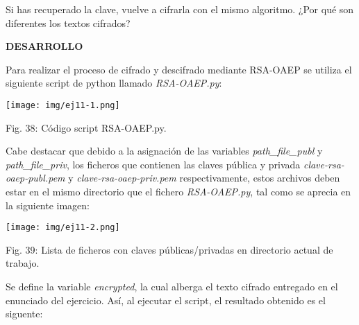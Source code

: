 \documentclass[12pt,oneside,a4paper]{book}
\begin{document}
\vspace{1em}

Si has recuperado la clave, vuelve a cifrarla con el mismo algoritmo. ¿Por qué son diferentes los textos cifrados?

\vspace{2em}

\hspace{20pt} \textbf{DESARROLLO}

\vspace{1em}

\hspace{20pt}
Para realizar el proceso de cifrado y descifrado mediante RSA-OAEP se utiliza el siguiente script de python llamado \textit{RSA-OAEP.py}:

\vspace{2em}

\begin{center}
    \texttt{[image: img/ej11-1.png]}
    
\vspace{0.1em}
    
    Fig. 38: Código script RSA-OAEP.py.
\end{center}

\vspace{2em}

Cabe destacar que debido a la asignación de las variables \textit{path\_file\_publ} y \textit{path\_file\_priv}, los ficheros que contienen las claves pública y privada \textit{clave-rsa-oaep-publ.pem} y \textit{clave-rsa-oaep-priv.pem} respectivamente, estos archivos deben estar en el mismo directorio que el fichero \textit{RSA-OAEP.py}, tal como se aprecia en la siguiente imagen:

\vspace{2em}

\begin{center}
    \texttt{[image: img/ej11-2.png]}
    
\vspace{0.1em}
    
    Fig. 39: Lista de ficheros con claves públicas/privadas en directorio actual de trabajo.
\end{center}

\vspace{2em}

\hspace{20pt}
Se define la variable \textit{encrypted}, la cual alberga el texto cifrado entregado en el enunciado del ejercicio. Así, al ejecutar el script, el resultado obtenido es el siguente:
\end{document}
